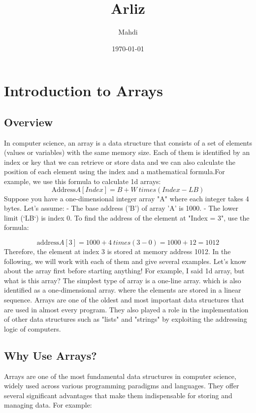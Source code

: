 \documentclass[12pt, oneside]{book}
\title{{\Huge Arliz}}
\author{{\LARGE Mahdi}}
\date{{\large \today}}
\begin{document}
	\frontmatter
	\mainmatter
	\maketitle
	\tableofcontents
\chapter{Introduction to Arrays}
	
\section{Overview}
In computer science, an array is a data structure that consists of a set of elements (values ​​or variables) with the same memory size. Each of them is identified by an index or key that we can retrieve or store data and we can also calculate the position of each element using the index and a mathematical formula.For example, we use this formula to calculate 1d arrays:
\[\text{Address} A[Index] = B + W \ times (Index - LB)\]
Suppose you have a one-dimensional integer array "A" where each integer takes 4 bytes. Let's assume:
- The base address ('B') of array 'A' is 1000.
- The lower limit (`LB`) is index 0.
To find the address of the element at "Index = 3", use the formula:

\[\text{address} A[3] = 1000 + 4 \ times (3 - 0) = 1000 + 12 = 1012\]
Therefore, the element at index 3 is stored at memory address 1012.
In the following, we will work with each of them and give several examples. Let's know about the array first before starting anything!
For example, I said 1d array, but what is this array?
The simplest type of array is a one-line array. which is also identified as a one-dimensional array. where the elements are stored in a linear sequence. Arrays are one of the oldest and most important data structures that are used in almost every program. They also played a role in the implementation of other data structures such as "lists" and "strings" by exploiting the addressing logic of computers.

\printbibliography
\section{Why Use Arrays?}

Arrays are one of the most fundamental data structures in computer science, widely used across various programming paradigms and languages. They offer several significant advantages that make them indispensable for storing and managing data.  For example:
\end{document}
